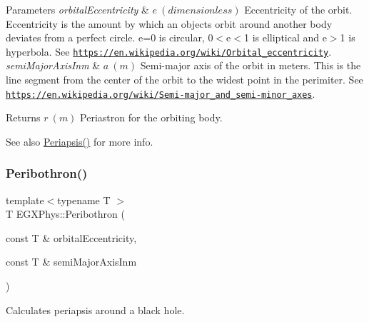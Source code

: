 \begin{DoxyParams}{Parameters}
{\em orbital\+Eccentricity} & $ e\ (dimensionless)$ Eccentricity of the orbit. Eccentricity is the amount by which an objects orbit around another body deviates from a perfect circle. e=0 is circular, 0$<$e$<$1 is elliptical and e$>$1 is hyperbola. See \href{https://en.wikipedia.org/wiki/Orbital_eccentricity}{\tt https\+://en.\+wikipedia.\+org/wiki/\+Orbital\+\_\+eccentricity}. \\
\hline
{\em semi\+Major\+Axis\+Inm} & $ a\ (m)$ Semi-\/major axis of the orbit in meters. This is the line segment from the center of the orbit to the widest point in the perimiter. See \href{https://en.wikipedia.org/wiki/Semi-major_and_semi-minor_axes}{\tt https\+://en.\+wikipedia.\+org/wiki/\+Semi-\/major\+\_\+and\+\_\+semi-\/minor\+\_\+axes}. \\
\hline
\end{DoxyParams}
\begin{DoxyReturn}{Returns}
$ r\ (m)$ Periastron for the orbiting body. 
\end{DoxyReturn}
\begin{DoxySeeAlso}{See also}
\mbox{\hyperlink{group___e_g_x_phys-_periapsis_gad487212733711bc2ce73c8137c9309c3}{Periapsis()}} for more info. 
\end{DoxySeeAlso}
\mbox{\label{group___e_g_x_phys-_periapsis_gad43bb3a6be82521d41d7a55453dec47e}} 
\subsubsection{\texorpdfstring{Peribothron()}{Peribothron()}}
{\footnotesize\ttfamily template$<$typename T $>$ \\
T E\+G\+X\+Phys\+::\+Peribothron (\begin{DoxyParamCaption}\item[{const T \&}]{orbital\+Eccentricity,  }\item[{const T \&}]{semi\+Major\+Axis\+Inm }\end{DoxyParamCaption})}



Calculates periapsis around a black hole. 


